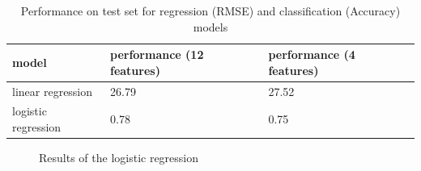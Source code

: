 \documentclass{article}
\begin{document}
\begin{table}
  \caption{Performance on test set for regression (RMSE) and classification (Accuracy) models} 
  \label{performance}
  \centering
  \begin{tabular}{lll}
  \\
    \toprule    
    model     & performance (12 features)     & performance (4 features) \\
    \midrule
    linear regression & 26.79  &   27.52   \\
    logistic regression & 0.78 &  0.75 \\
    \bottomrule
  \end{tabular}
\end{table}

\begin{figure}[!h]
  \centering
  \hspace{0mm}
  \caption{Results of the logistic regression}
\end{figure}
\end{document}
